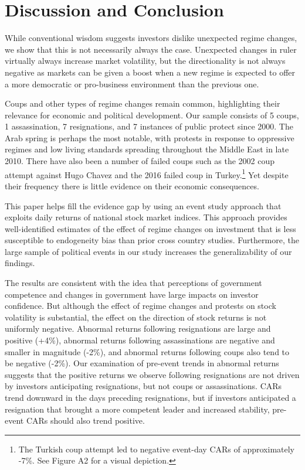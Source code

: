 \documentclass[12pt,final,fleqn]{article}
\theoremstyle{plain}
\begin{document}
\section{Discussion and Conclusion}

While conventional wisdom suggests investors dislike unexpected regime changes, we show that this is not necessarily always the case. Unexpected changes in ruler virtually always increase market volatility, but the directionality is not always negative as markets can be given a boost when a new regime is expected to offer a more democratic or pro-business environment than the previous one. 

Coups and other types of regime changes remain common, highlighting their relevance for economic and political development. Our sample consists of 5 coups, 1 assassination, 7 resignations, and 7 instances of public protect since 2000. The Arab spring is perhaps the most notable, with protests in response to oppressive regimes and low living standards spreading throughout the Middle East in late 2010. There have also been a number of failed coups such as the 2002 coup attempt against Hugo Chavez and the 2016 failed coup in Turkey.\footnote{The Turkish coup attempt led to negative event-day CARs of approximately -7\%. See Figure A2 for a visual depiction.} Yet despite their frequency there is little evidence on their economic consequences.

This paper helps fill the evidence gap by using an event study approach that exploits daily returns of national stock market indices. This approach provides well-identified estimates of the effect of regime changes on investment that is less susceptible to endogeneity bias than prior cross country studies. Furthermore, the large sample of political events in our study increases the generalizability of our findings.  

The results are consistent with the idea that perceptions of government competence and changes in government have large impacts on investor confidence. But although the effect of regime changes and protests on stock volatility is substantial, the effect on the direction of stock returns is not uniformly negative. Abnormal returns following resignations are large and positive (+4\%), abnormal returns following assassinations are negative and smaller in magnitude (-2\%), and abnormal returns following coups also tend to be negative (-2\%). Our examination of pre-event trends in abnormal returns suggests that the positive returns we observe following resignations are not driven by investors anticipating resignations, but not coups or assassinations. CARs trend downward in the days preceding resignations, but if investors anticipated a resignation that brought a more competent leader and increased stability, pre-event CARs should also trend positive. 
\end{document}
